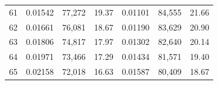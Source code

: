 \begin{tabular}{cccc|ccc}
61   & 0.01542                                                          & 77,272                                                                                            & 19.37                                                                                                                      & 0.01101                                                          & 84,555                                                                                            & 21.66                                                                                                                      \\
62   & 0.01661                                                          & 76,081                                                                                            & 18.67                                                                                                                      & 0.01190                                                          & 83,629                                                                                            & 20.90                                                                                                                      \\
63   & 0.01806                                                          & 74,817                                                                                            & 17.97                                                                                                                      & 0.01302                                                          & 82,640                                                                                            & 20.14                                                                                                                      \\
64   & 0.01971                                                          & 73,466                                                                                            & 17.29                                                                                                                      & 0.01434                                                          & 81,571                                                                                            & 19.40                                                                                                                      \\
65   & 0.02158                                                          & 72,018                                                                                            & 16.63                                                                                                                      & 0.01587                                                          & 80,409                                                                                            & 18.67                                                                                                                      \\

\end{tabular}
